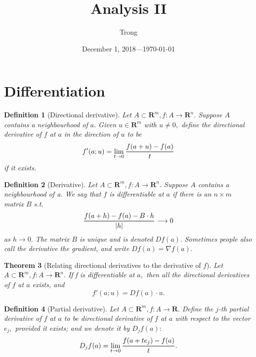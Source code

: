 \documentclass[12pt]{article}
\title{Analysis II}
\author{Trong}
\date{December 1, 2018---\today}
\theoremstyle{plain}
\newtheorem{theorem}{Theorem}
\newtheorem{definition}[theorem]{Definition}
\theoremstyle{definition}
\theoremstyle{remark}
\renewcommand\frac[2]{\genfrac{}{}{0.6pt}{}{#1}{#2}}
\newcommand{\bR}{\mathbf R}
\newcommand{\0}{\varnothing}
\newcommand{\<}{\langle}
\renewcommand{\>}{\rangle}
\begin{document}
\sloppy
\maketitle

\tableofcontents

\section{Differentiation}

\begin{definition}[Directional derivative]
  Let \( A \subset \bR^m, f: A\longrightarrow \bR^n. \) Suppose $A$ contains a neighbourhood of \( a. \) Given \( u \in \bR^m \) with \( u \neq 0, \) define the directional derivative of \( f \) at \( a \) in the direction of \( u \) to be
  \[
  f'(a; u) = \lim_{t\to 0} \frac{f(a+u) - f(a)}{t}
  \]
if it exists.
\end{definition}

\begin{definition}[Derivative]
  Let \( A \subset \bR^m, f: A\longrightarrow \bR^n. \) Suppose $A$ contains a
  neighbourhood of a. We say that \( f \) is differentiable at \( a \) if there
  is an \( n\times m \) matrix $B$ s.t.
\[
\frac{f(a+h) - f(a) - B\cdot h}{|h|} \longrightarrow 0
\]
as \( h \longrightarrow 0. \) The matrix $B$ is unique and is denoted \( D f(a).
\) Sometimes people also call the derivative the gradient, and write \( D f(a) =
\nabla f(a). \)
\end{definition}

\begin{theorem}[Relating directional derivatives to the derivative of \( f \)]
  Let \( A \subset \bR^m, f: A\longrightarrow \bR^n. \) If f is differentiable at \( a, \) then all the directional derivatives of \( f \) at \( a \) exists, and
\[
f'(a; u) = D f(a) \cdot u.
\]
\end{theorem}

\begin{definition}[Partial derivative]
  Let \( A \subset \bR^m, f: A \longrightarrow \bR. \) Define the \( j \)-th partial derivative of \( f \) at \( a \) to be directional derivative of \( f \) at \( a \) with respect to the vector \( e_j, \) provided it exists; and we denote it by \( D_j f(a): \)
  \[
  D_j f(a) = \lim_{t\to 0} \frac{f(a + t e_j) - f(a)}{t}.
  \]
\end{definition}
\end{document}
